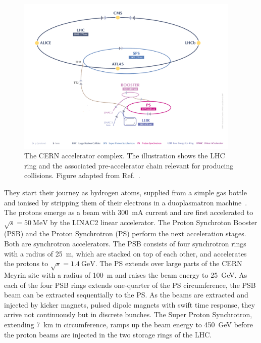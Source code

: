 \begin{figure}[htbp]
    \centering
    \includegraphics[width=0.95\textwidth]{figures/experiment/cernaccelerators.png}
    \caption{The CERN accelerator complex. The illustration shows the LHC ring and the associated pre-accelerator chain relevant for producing \HepProcess{\Pp\Pp} collisions. Figure adapted from Ref.~\cite{Mobs:2197559}.}
    \label{fig:LHC-chain}
\end{figure}

They start their journey as hydrogen atoms, supplied from a simple gas bottle and ionised by stripping them of their electrons in a duoplasmatron machine~\cite{Bailey2014}.
The protons emerge as a beam with \SI{300}{\milli\ampere} current and are first accelerated to \(\sqrt{s} = \SI{50}{\mega\electronvolt}\) by the LINAC2 linear accelerator.
The Proton Synchroton Booster (PSB) and the Proton Synchrotron (PS) perform the next acceleration stages. Both are synchrotron accelerators. The PSB consists of four synchrotron rings with a radius of \SI{25}{\meter}, which are stacked on top of each other, and accelerates the protons to \(\sqrt{s} = \SI{1.4}{\giga\electronvolt}\). The PS extends over large parts of the CERN Meyrin site with a radius of \SI{100}{\meter} and raises the beam energy to \SI{25}{\giga\electronvolt}. As each of the four PSB rings extends one-quarter of the PS circumference, the PSB beam can be extracted sequentially to the PS. As the beams are extracted and injected by kicker magnets, pulsed dipole magnets with swift time response, they arrive not continuously but in discrete bunches.
The Super Proton Synchrotron, extending \SI{7}{\kilo\meter} in circumference, ramps up the beam energy to \SI{450}{\giga\electronvolt} before the proton beams are injected in the two storage rings of the LHC.

